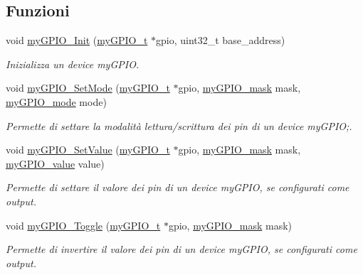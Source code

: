 \subsection*{Funzioni}
\begin{DoxyCompactItemize}
\item 
void \hyperlink{group__bare-metal_ga588201358d1633c53535b288c9198531}{my\+G\+P\+I\+O\+\_\+\+Init} (\hyperlink{structmy_g_p_i_o__t}{my\+G\+P\+I\+O\+\_\+t} $\ast$gpio, uint32\+\_\+t base\+\_\+address)
\begin{DoxyCompactList}\small\item\em Inizializza un device my\+G\+P\+IO. \end{DoxyCompactList}\item 
void \hyperlink{group__bare-metal_ga43e82eb0febd452635a438fbd9cb853b}{my\+G\+P\+I\+O\+\_\+\+Set\+Mode} (\hyperlink{structmy_g_p_i_o__t}{my\+G\+P\+I\+O\+\_\+t} $\ast$gpio, \hyperlink{group__bare-metal_ga402a0d20afc0cb7c25554b8b023f4253}{my\+G\+P\+I\+O\+\_\+mask} mask, \hyperlink{group__bare-metal_ga76b849f0e0c05e7f9161bdb33396f2b1}{my\+G\+P\+I\+O\+\_\+mode} mode)
\begin{DoxyCompactList}\small\item\em Permette di settare la modalità lettura/scrittura dei pin di un device my\+G\+P\+IO;. \end{DoxyCompactList}\item 
void \hyperlink{group__bare-metal_ga9d9ce9d2db7d77a588da4a3749f2f24d}{my\+G\+P\+I\+O\+\_\+\+Set\+Value} (\hyperlink{structmy_g_p_i_o__t}{my\+G\+P\+I\+O\+\_\+t} $\ast$gpio, \hyperlink{group__bare-metal_ga402a0d20afc0cb7c25554b8b023f4253}{my\+G\+P\+I\+O\+\_\+mask} mask, \hyperlink{group__bare-metal_gaf634fe4a0e1eab8da5000b72d6ad362b}{my\+G\+P\+I\+O\+\_\+value} value)
\begin{DoxyCompactList}\small\item\em Permette di settare il valore dei pin di un device my\+G\+P\+IO, se configurati come output. \end{DoxyCompactList}\item 
void \hyperlink{group__bare-metal_ga449b2af7cc20d24e6f6e017cf792ce03}{my\+G\+P\+I\+O\+\_\+\+Toggle} (\hyperlink{structmy_g_p_i_o__t}{my\+G\+P\+I\+O\+\_\+t} $\ast$gpio, \hyperlink{group__bare-metal_ga402a0d20afc0cb7c25554b8b023f4253}{my\+G\+P\+I\+O\+\_\+mask} mask)
\begin{DoxyCompactList}\small\item\em Permette di invertire il valore dei pin di un device my\+G\+P\+IO, se configurati come output. \end{DoxyCompactList}\item 

\end{DoxyCompactItemize}
